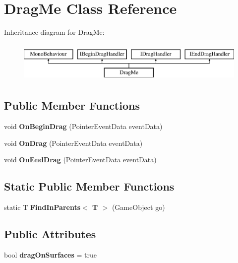\hypertarget{class_drag_me}{}\section{Drag\+Me Class Reference}
\label{class_drag_me}
Inheritance diagram for Drag\+Me\+:\begin{figure}[H]
\begin{center}
\leavevmode
\includegraphics[height=2.000000cm]{class_drag_me}
\end{center}
\end{figure}
\subsection*{Public Member Functions}
\begin{DoxyCompactItemize}
\item 
\mbox{\label{class_drag_me_a909b4c3171366774336da808e78536c1}} 
void {\bfseries On\+Begin\+Drag} (Pointer\+Event\+Data event\+Data)
\item 
\mbox{\label{class_drag_me_a7fe317d520b52f3715c479acf3f9c8ad}} 
void {\bfseries On\+Drag} (Pointer\+Event\+Data event\+Data)
\item 
\mbox{\label{class_drag_me_aa88fcb1b25771d08f1d84c5a0c0fadb7}} 
void {\bfseries On\+End\+Drag} (Pointer\+Event\+Data event\+Data)
\end{DoxyCompactItemize}
\subsection*{Static Public Member Functions}
\begin{DoxyCompactItemize}
\item 
\mbox{\label{class_drag_me_ad416837ac2dd8a9b4fb586fbee0fb800}} 
static T {\bfseries Find\+In\+Parents$<$ T $>$} (Game\+Object go)
\end{DoxyCompactItemize}
\subsection*{Public Attributes}
\begin{DoxyCompactItemize}
\item 
\mbox{\label{class_drag_me_a6d6b13012ce5930b6c126c4fae409f6b}} 
bool {\bfseries drag\+On\+Surfaces} = true
\end{DoxyCompactItemize}
